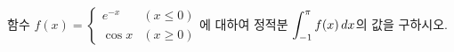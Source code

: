 함수 $f(x)=\begin{cases} e^{-x} & (x\le 0) \\ \cos x & (x\ge 0) \end{cases}$에 대하여 정적분 $\displaystyle\int_{-1}^{\pi}f(x)\mkern3mu dx$의 값을 구하시오.
